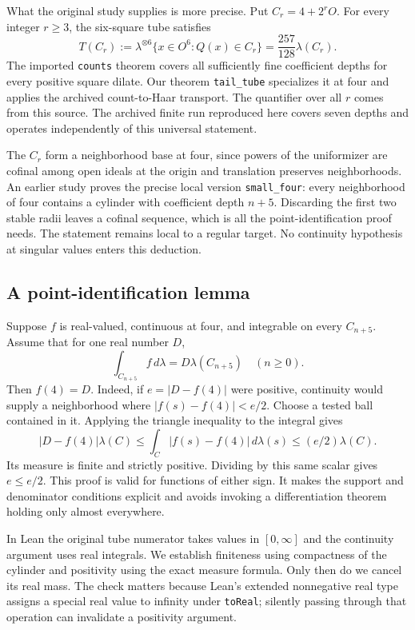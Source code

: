 \documentclass[12pt,letterpaper]{article}
\newcommand{\id}[1]{{\small\nolinkurl{#1}}}
\begin{document}
What the original study supplies is more precise. Put $C_r=4+2^r O$. For every integer $r\ge3$, the six-square tube satisfies
\[
 T(C_r):=\lambda^{\otimes6}\{x\in O^6:Q(x)\in C_r\}
          =\frac{257}{128}\lambda(C_r).
\]
The imported \id{counts} theorem covers all sufficiently fine coefficient depths for every positive square dilate. Our theorem \id{tail_tube} specializes it at four and applies the archived count-to-Haar transport. The quantifier over all $r$ comes from this source. The archived finite run reproduced here covers seven depths and operates independently of this universal statement.

The $C_r$ form a neighborhood base at four, since powers of the uniformizer are cofinal among open ideals at the origin and translation preserves neighborhoods. An earlier study proves the precise local version \id{small_four}: every neighborhood of four contains a cylinder with coefficient depth $n+5$. Discarding the first two stable radii leaves a cofinal sequence, which is all the point-identification proof needs. The statement remains local to a regular target. No continuity hypothesis at singular values enters this deduction.

\subsection{A point-identification lemma}
Suppose $f$ is real-valued, continuous at four, and integrable on every $C_{n+5}$. Assume that for one real number $D$,
\[
                    \int_{C_{n+5}}f\,d\lambda = D\lambda(C_{n+5})
                        \quad(n\ge0).
\]
Then $f(4)=D$. Indeed, if $e=|D-f(4)|$ were positive, continuity would supply a neighborhood where $|f(s)-f(4)|<e/2$. Choose a tested ball contained in it. Applying the triangle inequality to the integral gives
\[
 |D-f(4)|\lambda(C)\le \int_C |f(s)-f(4)|\,d\lambda(s)
                    \le (e/2)\lambda(C).
\]
Its measure is finite and strictly positive. Dividing by this same scalar gives $e\le e/2$. This proof is valid for functions of either sign. It makes the support and denominator conditions explicit and avoids invoking a differentiation theorem holding only almost everywhere.

In Lean the original tube numerator takes values in $[0,\infty]$ and the continuity argument uses real integrals. We establish finiteness using compactness of the cylinder and positivity using the exact measure formula. Only then do we cancel its real mass. The check matters because Lean's extended nonnegative real type assigns a special real value to infinity under \id{toReal}; silently passing through that operation can invalidate a positivity argument.
\end{document}
